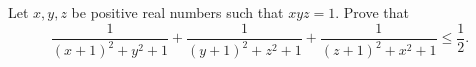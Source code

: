 \documentclass[varwidth]{standalone}
\begin{document}
    Let $x, y, z$ be positive real numbers such that $xyz = 1$. Prove that
    \[
        \frac{1}{{(x + 1)}^2 + y^2 + 1} + \frac{1}{{(y + 1)}^2 + z^2 + 1} + \frac{1}{{(z + 1)}^2 + x^2 + 1} \leq \frac{1}{2}.  
    \]
\end{document}
